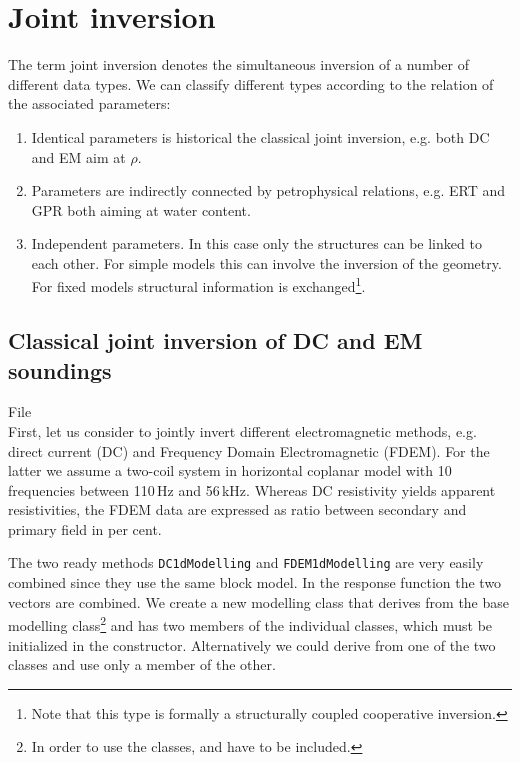 \section{Joint inversion}\label{sec:joint}
The term joint inversion denotes the simultaneous inversion of a number of different data types.
We can classify different types according to the relation of the associated parameters:
\begin{enumerate}
	\item Identical parameters is historical the classical joint inversion, e.g. both DC and EM aim at $\rho$.
	\item Parameters are indirectly connected by petrophysical relations, e.g. ERT and GPR both aiming at water content.
	\item Independent parameters. In this case only the structures can be linked to each other. For simple models this can involve the inversion of the geometry. For fixed models structural information is exchanged\footnote{Note that this type is formally a structurally coupled cooperative inversion.}.
\end{enumerate}

\subsection{Classical joint inversion of DC and EM soundings}\label{sec:jointdcem}
File \\
First, let us consider to jointly invert different electromagnetic methods, e.g. direct current (DC) and Frequency Domain Electromagnetic (FDEM).
For the latter we assume a two-coil system in horizontal coplanar model with 10 frequencies between 110\,Hz and 56\,kHz.
Whereas DC resistivity yields apparent resistivities, the FDEM data are expressed as ratio between secondary and primary field in per cent.

The two ready methods \lstinline|DC1dModelling| and \lstinline|FDEM1dModelling| are very easily combined since they use the same block model.
In the response function the two vectors are combined.
We create a new modelling class that derives from the base modelling class\footnote{In order to use the classes,  and  have to be included.} and has two members of the individual classes, which must be initialized in the constructor.
Alternatively we could derive from one of the two classes and use only a member of the other.

